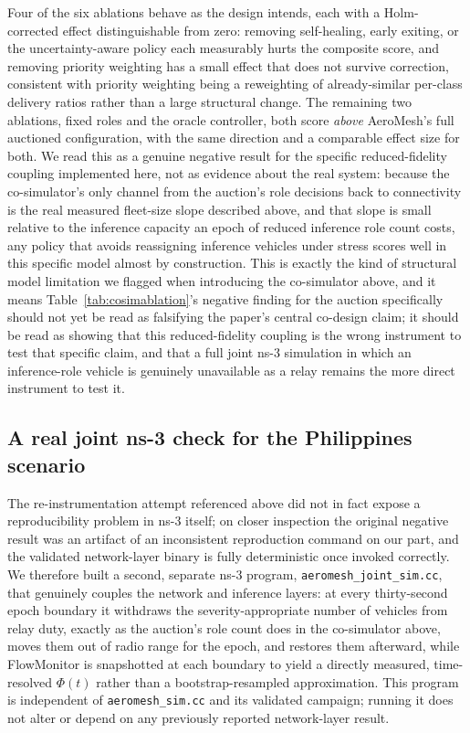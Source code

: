 \documentclass[drones,article,submit,moreauthors]{Definitions/mdpi}
\begin{document}
Four of the six ablations behave as the design intends, each with a Holm-corrected effect distinguishable from zero: removing self-healing, early exiting, or the uncertainty-aware policy each measurably hurts the composite score, and removing priority weighting has a small effect that does not survive correction, consistent with priority weighting being a reweighting of already-similar per-class delivery ratios rather than a large structural change. The remaining two ablations, fixed roles and the oracle controller, both score \emph{above} AeroMesh's full auctioned configuration, with the same direction and a comparable effect size for both. We read this as a genuine negative result for the specific reduced-fidelity coupling implemented here, not as evidence about the real system: because the co-simulator's only channel from the auction's role decisions back to connectivity is the real measured fleet-size slope described above, and that slope is small relative to the inference capacity an epoch of reduced inference role count costs, any policy that avoids reassigning inference vehicles under stress scores well in this specific model almost by construction. This is exactly the kind of structural model limitation we flagged when introducing the co-simulator above, and it means Table~\ref{tab:cosimablation}'s negative finding for the auction specifically should not yet be read as falsifying the paper's central co-design claim; it should be read as showing that this reduced-fidelity coupling is the wrong instrument to test that specific claim, and that a full joint ns-3 simulation in which an inference-role vehicle is genuinely unavailable as a relay remains the more direct instrument to test it.

\subsection{A real joint ns-3 check for the Philippines scenario}
\label{sec:results-joint-real}

The re-instrumentation attempt referenced above did not in fact expose a reproducibility problem in ns-3 itself; on closer inspection the original negative result was an artifact of an inconsistent reproduction command on our part, and the validated network-layer binary is fully deterministic once invoked correctly. We therefore built a second, separate ns-3 program, \texttt{aeromesh\_joint\_sim.cc}, that genuinely couples the network and inference layers: at every thirty-second epoch boundary it withdraws the severity-appropriate number of vehicles from relay duty, exactly as the auction's role count does in the co-simulator above, moves them out of radio range for the epoch, and restores them afterward, while FlowMonitor is snapshotted at each boundary to yield a directly measured, time-resolved $\Phi(t)$ rather than a bootstrap-resampled approximation. This program is independent of \texttt{aeromesh\_sim.cc} and its validated campaign; running it does not alter or depend on any previously reported network-layer result.
\end{document}
